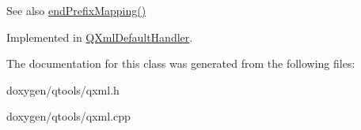 \begin{DoxySeeAlso}{See also}
\mbox{\hyperlink{class_q_xml_content_handler_a1c7f3e794c2e763e043eef3229ccf034}{end\+Prefix\+Mapping()}} 
\end{DoxySeeAlso}


Implemented in \mbox{\hyperlink{class_q_xml_default_handler_a5f8b32143da1251f62c64df4742df77c}{Q\+Xml\+Default\+Handler}}.



The documentation for this class was generated from the following files\+:\begin{DoxyCompactItemize}
\item 
doxygen/qtools/qxml.\+h\item 
doxygen/qtools/qxml.\+cpp\end{DoxyCompactItemize}
